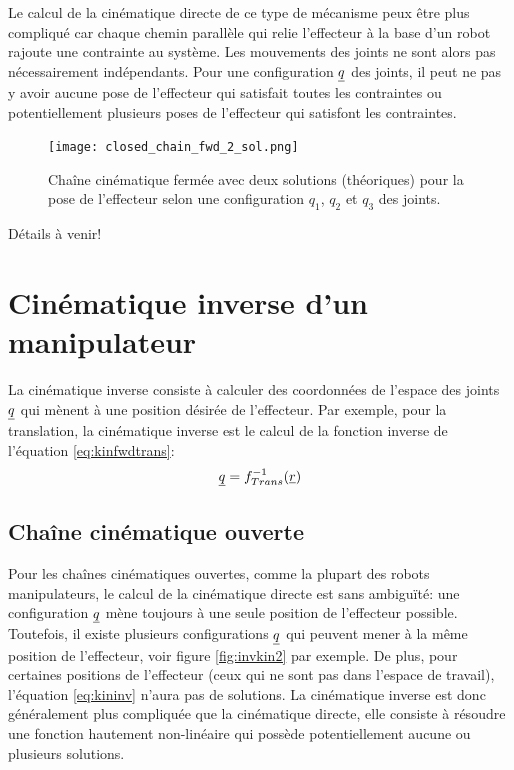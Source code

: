 Le calcul de la cinématique directe de ce type de mécanisme peux être plus compliqué car chaque chemin parallèle qui relie l'effecteur à la base d'un robot rajoute une contrainte au système. Les mouvements des joints ne sont alors pas nécessairement indépendants. Pour une configuration $\underline{q}$ des joints, il peut ne pas y avoir aucune pose de l'effecteur qui satisfait toutes les contraintes ou potentiellement plusieurs poses de l'effecteur qui satisfont les contraintes.
\begin{figure}[H]
	\centering
		\texttt{[image: closed\_chain\_fwd\_2\_sol.png]}
	\caption{Chaîne cinématique fermée avec deux solutions (théoriques) pour la pose de l'effecteur selon une configuration $q_1$, $q_2$ et $q_3$ des joints. }
	\label{fig:closed_chain_fwd_2_sol}
\end{figure}


Détails à venir!





\newpage
\section{Cinématique inverse d'un manipulateur}
\label{sec:invkin}

La cinématique inverse consiste à calculer des coordonnées de l'espace des joints $\underline{q}$ qui mènent à une position désirée de l'effecteur. Par exemple, pour la translation, la cinématique inverse est le calcul de la fonction inverse de l'équation \eqref{eq:kinfwdtrans}:
\begin{align}
\underline{q} = f^{-1}_{Trans}( \underline{r} )
\label{eq:kininv}
\end{align} 


\subsection{Chaîne cinématique ouverte}

Pour les chaînes cinématiques ouvertes, comme la plupart des robots manipulateurs, le calcul de la cinématique directe est sans ambiguïté: une configuration $\underline{q}$ mène toujours à une seule position de l'effecteur possible. Toutefois, il existe plusieurs configurations $\underline{q}$ qui peuvent mener à la même position de l'effecteur, voir figure \ref{fig:invkin2} par exemple. De plus, pour certaines positions de l'effecteur (ceux qui ne sont pas dans l'espace de travail), l'équation \eqref{eq:kininv} n'aura pas de solutions. La cinématique inverse est donc généralement plus compliquée que la cinématique directe, elle consiste à résoudre une fonction hautement non-linéaire qui possède potentiellement aucune ou plusieurs solutions. 


